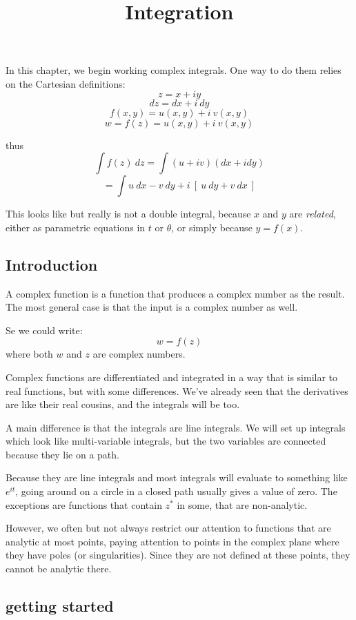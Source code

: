 \documentclass[11pt, oneside]{article}
\title{Integration}
\date{}
\begin{document}
\maketitle
\Large


In this chapter, we begin working complex integrals.  One way to do them relies on the Cartesian definitions:
\[ z = x + iy \]
\[ dz = dx + i \ dy \]
\[ f(x,y) = u(x,y) + i \ v(x,y) \]
\[ w = f(z) = u(x,y) + i \ v(x,y) \]

thus
\[ \int f(z) \ dz = \int (u + iv)(dx + i dy) \]
\[ = \int u \ dx - v \ dy + i \ [ \ u \ dy + v \ dx \ ] \]

This looks like but really is not a double integral, because $x$ and $y$ are \emph{related}, either as parametric equations in $t$ or $\theta$, or simply because $y = f(x)$.

\subsection*{Introduction}

A complex function is a function that produces a complex number as the result. The most general case is that the input is a complex number as well.  

Se we could write:
\[ w = f(z) \]
where both $w$ and $z$ are complex numbers.

Complex functions are differentiated and integrated in a way that is similar to real functions, but with some differences.  We've already seen that the derivatives are like their real cousins, and the integrals will be too.

A main difference is that the integrals are line integrals.  We will set up integrals which look like multi-variable integrals, but the two variables are connected because they lie on a path.  

Because they are line integrals and most integrals will evaluate to something like $e^{it}$, going around on a circle in a closed path usually gives a value of zero.  The exceptions are functions that contain $z^*$ in some, that are non-analytic.

However, we often but not always restrict our attention to functions that are analytic at most points, paying attention to points in the complex plane where they have poles (or singularities).  Since they are not defined at these points, they cannot be analytic there.

\subsection*{getting started}
\end{document}
